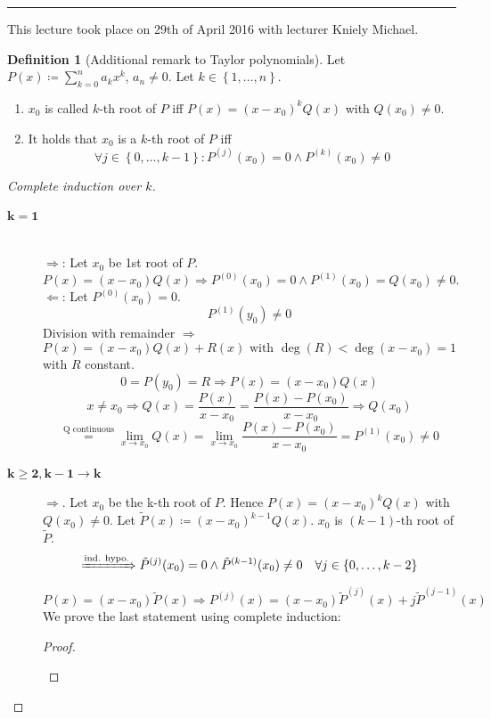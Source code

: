 \documentclass[a4paper,landscape,twocolumn]{article}
\theoremstyle{definition}
\newtheorem{defi}{Definition}
\newcommand\set[1]{\left\{#1\right\}}
\newcommand\meta[3]{\hrule{} This #1 took place on #2 with lecturer #3.\par}
\begin{document}
\meta{lecture}{29th of April 2016}{Kniely Michael}

\begin{defi}[Additional remark to Taylor polynomials]
  Let $P(x) \coloneqq \sum_{k=0}^n a_k x^k$, $a_n \neq 0$. Let $k \in \set{1, \ldots, n}$.
  \begin{enumerate}
    \item $x_0$ is called $k$-th root of $P$ iff $P(x) = (x - x_0)^k Q(x)$ with $Q(x_0) \neq 0$.
    \item It holds that $x_0$ is a $k$-th  root of $P$ iff
      \[ \forall j \in \set{0,\ldots,k-1}: P^{(j)}(x_0) = 0 \land P^{(k)}(x_0) \neq 0 \]
  \end{enumerate}
\end{defi}
\begin{proof}[Complete induction over $k$]
  \begin{description}
    \item[$\mathbf{k=1}$] \hfill{} \\
      $\Rightarrow$: Let $x_0$ be 1st root of $P$.
        \[ P(x) = (x - x_0) Q(x) \Rightarrow P^{(0)}(x_0) = 0 \land P^{(1)}(x_0) = Q(x_0) \neq 0. \]
      $\Leftarrow$: Let $P^{(0)}(x_0) = 0$.
        \[ P^{(1)}(y_0) \neq 0 \]
        Division with remainder $\Rightarrow$
        \[ P(x) = (x - x_0) Q(x) + R(x) \text{ with } \deg(R) < \deg(x - x_0) = 1 \]
        with $R$ constant.
        \[ 0 = P(y_0) = R \Rightarrow P(x) = (x - x_0) Q(x) \]
        \[
          x \neq x_0 \Rightarrow Q(x) = \frac{P(x)}{x - x_0}
          = \frac{P(x) - P(x_0)}{x - x_0}
          \Rightarrow Q(x_0)
        \] \[
          \overset{\text{Q continuous}}{=}
          \lim_{x\to x_0} Q(x) = \lim_{x \to x_0} \frac{P(x) - P(x_0)}{x - x_0}
          = P^{(1)}(x_0) \neq 0
        \]
    \item[$\mathbf{k\geq 2, k-1 \to k}$]
      $\Rightarrow$. Let $x_0$ be the k-th root of $P$.
      Hence $P(x) = (x - x_0)^k Q(x)$ with $Q(x_0) \neq 0$.
      Let $\tilde{P}(x) \coloneqq (x - x_0)^{k-1} Q(x)$.
      $x_0$ is $(k-1)$-th root of $\tilde{P}$.
      \[
        \xRightarrow{\text{ind. hypo.}}
        \tilde{P}^{(j)}(x_0) = 0
        \land \tilde{P}^{(k-1)}(x_0) \neq 0
        \quad \forall j \in \set{0,\ldots,k-2}
      \] \[
        P(x) = (x - x_0) \tilde{P}(x) \Rightarrow
        P^{(j)}(x) = (x - x_0) \tilde{P}^{(j)}(x) + j \tilde{P}^{(j-1)}(x)
      \]
      We prove the last statement using complete induction:
      \begin{proof}
        \begin{description}

\end{description}
\end{proof}
\end{description}
\end{proof}
\end{document}
